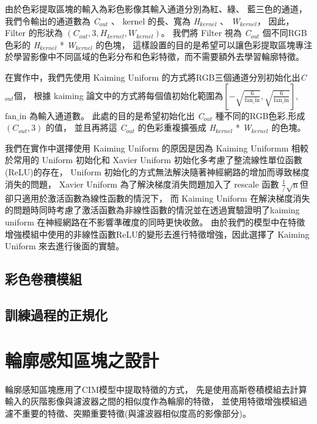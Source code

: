 \documentclass[class=NCU_thesis, crop=false]{standalone}
\begin{document}
	由於色彩提取區塊的輸入為彩色影像其輸入通道分別為紅、綠、 藍三色的通道，
	我們令輸出的通道數為 \textit{C}$_{out}$ 、 kernel 的長、寬為 \textit{H}$_{kernel}$ 、 \textit{W}$_{kernel}$，
	因此， Filter 的形狀為 $\left(C_{out} , 3, H_{kernel}, W_{kernel}\right)$。
	我們將 Filter 視為 \textit{C}$_{out}$ 個不同RGB色彩的 \textit{H}$_{kernel}$ * \textit{W}$_{kernel}$ 的色塊，
	這樣設置的目的是希望可以讓色彩提取區塊專注於學習影像中不同區域的色彩分布和色彩特徵，而不需要額外去學習輪廓特徵。

	在實作中，我們先使用 Kaiming Uniform 的方式將RGB三個通道分別初始化出\textit{C}$_{out}$個，
	根據 kaiming 論文\cite{DBLP:journals/corr/HeZR015}中的方式將每個值初始化範圍為$[-\sqrt{\frac{6}{\text{fan\_in}}}, \sqrt{\frac{6}{\text{fan\_in}}}]$,
	$\text{fan\_in}$ 為輸入通道數。
	此處的目的是希望初始化出 \textit{C}$_{out}$ 種不同的RGB色彩,形成 $\left(C_{out} , 3\right)$ 的值，
	並且再將這 \textit{C}$_{out}$ 的色彩重複擴張成 \textit{H}$_{kernel}$ * \textit{W}$_{kernel}$ 的色塊。

	我們在實作中選擇使用 Kaiming Uniform 的原因是因為 Kaiming Uniformm 相較於常用的 Uniform 初始化和 Xavier Uniform\cite{pmlr-v9-glorot10a} 初始化多考慮了整流線性單位函數(ReLU)的存在，
	Uniform 初始化的方式無法解決隨著神經網路的增加而導致梯度消失的問題，
	Xavier Uniform 為了解決梯度消失問題加入了 rescale 函數 $\frac{1} / \sqrt{\text{n}}$但卻只適用於激活函數為線性函數的情況下，
	而 Kaiming Uniform 在解決梯度消失的問題時同時考慮了激活函數為非線性函數的情況並在\cite{DBLP:journals/corr/HeZR015}透過實驗證明了kaiming uniform 在神經網路在不影響準確度的同時更快收斂。
	由於我們的模型中在特徵增強模組中使用的非線性函數ReLU的變形去進行特徵增強，因此選擇了 Kaiming Uniform 來去進行後面的實驗。

	\subsection{彩色卷積模組}

	\subsection{訓練過程的正規化}

\section{輪廓感知區塊之設計}
輪廓感知區塊應用了CIM模型中提取特徵的方式，
先是使用高斯卷積模組去計算輸入的灰階影像與濾波器之間的相似度作為輪廓的特徵，
並使用特徵增強模組過濾不重要的特徵、突顯重要特徵(與濾波器相似度高的影像部分)。
\end{document}
